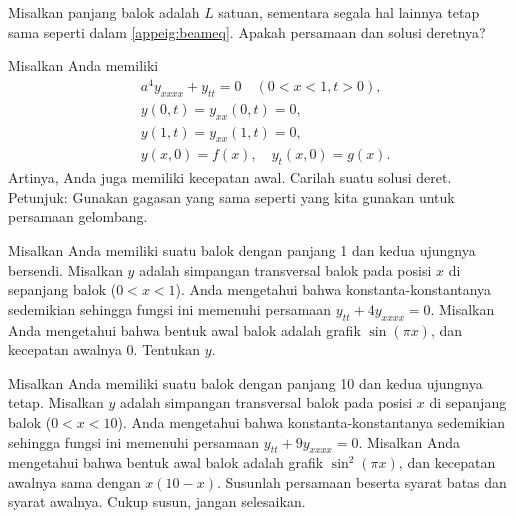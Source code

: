 \begin{exercise}
Misalkan panjang balok adalah $L$ satuan, sementara segala hal lainnya tetap sama
seperti dalam \eqref{appeig:beameq}.  Apakah persamaan dan
solusi deretnya?
\end{exercise}

\begin{exercise}
Misalkan Anda memiliki 
\begin{equation*}
\begin{aligned}
& a^4 y_{xxxx} + y_{tt} = 0 \quad (0 < x < 1, t > 0) , \\
& y(0,t) = y_{xx}(0,t) = 0,\\
& y(1,t) = y_{xx}(1,t) = 0 ,\\
& y(x,0) = f(x), \quad y_{t}(x,0) = g(x) .
\end{aligned}
\end{equation*}
Artinya, Anda juga memiliki kecepatan awal.  Carilah suatu solusi deret.  Petunjuk:
Gunakan gagasan yang sama seperti yang kita gunakan untuk persamaan gelombang.
\end{exercise}

\setcounter{exercise}{100}

\begin{exercise}
Misalkan Anda memiliki suatu balok dengan panjang 1 dan kedua ujungnya bersendi.  Misalkan $y$ adalah
simpangan transversal balok pada posisi $x$ di sepanjang balok ($0 < x < 1$).
Anda mengetahui bahwa
konstanta-konstantanya sedemikian sehingga fungsi ini memenuhi persamaan $y_{tt} + 4 y_{xxxx} =
0$.  Misalkan Anda mengetahui bahwa bentuk awal balok adalah grafik
$\sin (\pi x)$, dan kecepatan awalnya 0.  Tentukan $y$.
\end{exercise}

\begin{exercise}
Misalkan Anda memiliki suatu balok dengan panjang 10 dan kedua ujungnya tetap.  Misalkan $y$ adalah
simpangan transversal balok pada posisi $x$ di sepanjang balok ($0 < x < 10$).
Anda mengetahui bahwa
konstanta-konstantanya sedemikian sehingga fungsi ini memenuhi persamaan $y_{tt} + 9 y_{xxxx} =
0$.  Misalkan Anda mengetahui bahwa bentuk awal balok adalah grafik
$\sin^2(\pi x)$, dan kecepatan awalnya sama dengan $x(10-x)$.
Susunlah persamaan beserta
syarat batas dan syarat awalnya.  Cukup susun, jangan selesaikan.
\end{exercise}

